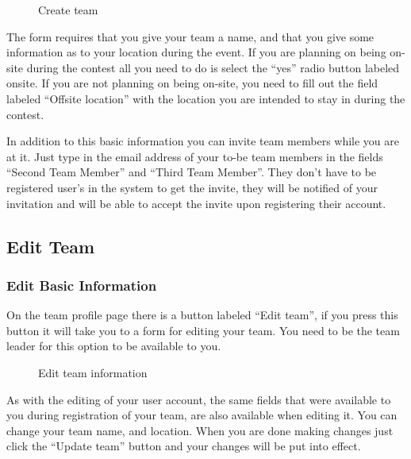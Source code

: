\begin{figure}
\centering
 \caption{Create team}
 \label{fig:createTeam}
\end{figure}

The form requires that you give your team a name, and that you give some
information as to your location during the event. If you are planning
on being on-site during the contest all you need to do is select the
{\textquotedblleft}yes{\textquotedblright} radio button labeled onsite.
If you are not planning on being on-site, you need to fill out the
field labeled {\textquotedblleft}Offsite location{\textquotedblright}
with the location you are intended to stay in during the contest. 


In addition to this basic information you can invite team members while
you are at it. Just type in the email address of your to-be team
members in the fields {\textquotedblleft}Second Team
Member{\textquotedblright} and {\textquotedblleft}Third Team
Member{\textquotedblright}. They don{\textquoteright}t have to be
registered user{\textquoteright}s in the system to get the invite, they
will be notified of your invitation and will be able to accept the
invite upon registering their account. 

\subsection{Edit Team}

\subsubsection{Edit Basic Information}

On the team profile page there is a button labeled
{\textquotedblleft}Edit team{\textquotedblright}, if you press this
button it will take you to a form for editing your team. You need to be
the team leader for this option to be available to you. 

\begin{figure}
\centering
	\caption{Edit team information}
	\label{fig:editTeamInfo}
\end{figure}

As with the editing of your user account, the same fields that were
available to you during registration of your team, are also available
when editing it. You can change your team name, and location. When you
are done making changes just click the {\textquotedblleft}Update
team{\textquotedblright} button and your changes will be put into
effect. 

